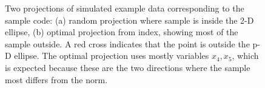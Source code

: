 \documentclass[
  12pt]{article}
\begin{document}
\begin{figure}

\begin{minipage}{0.50\linewidth}



\end{minipage}%
%
\begin{minipage}{0.50\linewidth}



\end{minipage}%

\caption{\label{fig-anomaly}Two projections of simulated example data
corresponding to the sample code: (a) random projection where sample is
inside the 2-D ellipse, (b) optimal projection from index, showing most
of the sample outside. A red cross indicates that the point is outside
the p-D ellipse. The optimal projection uses mostly variables
\(x_4, x_5\), which is expected because these are the two directions
where the sample most differs from the norm.}

\end{figure}%
\end{document}
